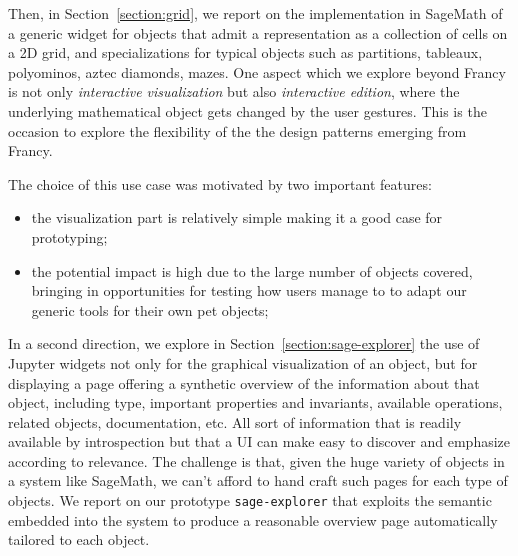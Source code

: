 \documentclass{deliverablereport}
\begin{document}
Then, in Section~\ref{section:grid}, we report on the implementation
in SageMath of a generic widget for objects that admit a
representation as a collection of cells on a 2D grid, and
specializations for typical objects such as partitions, tableaux,
polyominos, aztec diamonds, mazes. One aspect which we explore beyond
Francy is not only \emph{interactive visualization} but also
\emph{interactive edition}, where the underlying mathematical object
gets changed by the user gestures. This is the occasion to explore the
flexibility of the the design patterns emerging from Francy.

The choice of this use case was motivated by two important features:
\begin{itemize}
\item the visualization part is relatively simple making it a good
  case for prototyping;
\item the potential impact is high due to the large number of objects
  covered, bringing in opportunities for testing how users manage to
  to adapt our generic tools for their own pet objects;
\end{itemize}

In a second direction, we explore in
Section~\ref{section:sage-explorer} the use of Jupyter widgets not only
for the graphical visualization of an object, but for displaying a
page offering a synthetic overview of the information about that
object, including type, important properties and invariants, available
operations, related objects, documentation, etc. All sort of
information that is readily available by introspection but that a UI
can make easy to discover and emphasize according to relevance. The
challenge is that, given the huge variety of objects in a system like
SageMath, we can't afford to hand craft such pages for each type of
objects. We report on our prototype
\lstinline{sage-explorer} that exploits the semantic embedded into the
system to produce a reasonable overview page automatically tailored to
each object.

\end{document}

